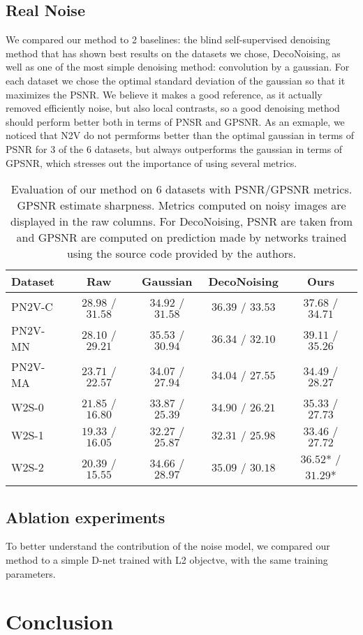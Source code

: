 \documentclass{article}
\begin{document}
\subsection{Real Noise}
We compared our method to 2 baselines: the blind self-supervised denoising method that has shown best results on the datasets we chose, DecoNoising, as well as one of the most simple denoising method: convolution by a gaussian.
For each dataset we chose the optimal standard deviation of the gaussian so that it maximizes the PSNR.
We believe it makes a good reference, as it actually removed efficiently noise, but also local contrasts, so a good denoising method should perform better both in terms of PNSR and GPSNR.
As an exmaple, we noticed that N2V do not permforms better than the optimal gaussian in terms of PSNR for 3 of the 6 datasets, but always outperforms the gaussian in terms of GPSNR, which stresses out the importance of using several metrics.

\begin{table*}[t]
\caption{Evaluation of our method on 6 datasets with PSNR/GPSNR metrics. GPSNR estimate sharpness. Metrics computed on noisy images are displayed in the raw columns. For DecoNoising, PSNR are taken from \cite{goncharova2020} and GPSNR are computed on prediction made by networks trained using the source code provided by the authors.}
\label{results}
\vskip 0.15in
\begin{center}
\begin{small}
\begin{sc}
\begin{tabular}{lcccc}
\toprule

Dataset & Raw & Gaussian & DecoNoising & Ours \\
\midrule
PN2V-C & $28.98$ / $31.58$ & $34.92$ / $31.58$ & $36.39$ / $33.53$ & $37.68$ / $34.71$ \\
PN2V-MN & $28.10$ / $29.21$ & $35.53$ / $30.94$ & $36.34$ / $32.10$ & $39.11$ / $35.26$\\
PN2V-MA & $23.71$ / $22.57$ & $34.07$ / $27.94$ & $34.04$ / $27.55$ & $34.49$ / $28.27$ \\
W2S-0 & $21.85$ / $16.80$ & $33.87$ / $25.39$ & $34.90$ / $26.21$ & $35.33$ / $27.73$ \\
W2S-1 & $19.33$ / $16.05$ & $32.27$ / $25.87$ & $32.31$ / $25.98$ & $33.46$ / $27.72$ \\
W2S-2 & $20.39$ / $15.55$ & $34.66$ / $28.97$ & $35.09$ / $30.18$ & $36.52$* / $31.29$* \\
\bottomrule
\end{tabular}
\end{sc}
\end{small}
\end{center}
\vskip -0.1in
\end{table*}

\subsection{Ablation experiments}
To better understand the contribution of the noise model, we compared our method to a simple D-net trained with L2 objectve, with the same training parameters.

\section{Conclusion}



{\small


}
\end{document}
